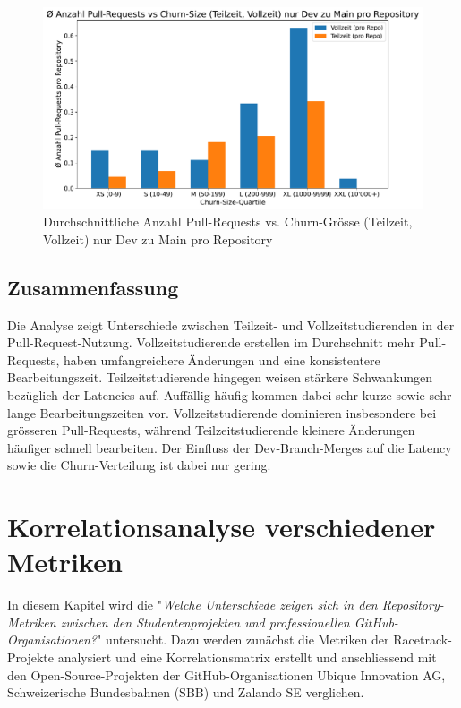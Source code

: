 \begin{figure}[htbp]
    \includegraphics[width=\textwidth]{Figures/avg-anz-prs-vs-churn-size-tz-vz-pro-repo-nur-dev.pdf}
    \caption{Durchschnittliche Anzahl Pull-Requests vs. Churn-Grösse (Teilzeit, Vollzeit) nur Dev zu Main pro Repository}
    \label{fig:anz-prs-vs-churn-size-tz-vz-nur-dev}
\end{figure}

\subsection{Zusammenfassung}

Die Analyse zeigt Unterschiede zwischen Teilzeit- und Vollzeitstudierenden in der Pull-Request-Nutzung. Vollzeitstudierende erstellen im Durchschnitt mehr Pull-Requests, haben umfangreichere Änderungen und eine konsistentere Bearbeitungszeit. Teilzeitstudierende hingegen weisen stärkere Schwankungen bezüglich der Latencies auf. Auffällig häufig kommen dabei sehr kurze sowie sehr lange Bearbeitungszeiten vor. Vollzeitstudierende dominieren insbesondere bei grösseren Pull-Requests, während Teilzeitstudierende kleinere Änderungen häufiger schnell bearbeiten. Der Einfluss der Dev-Branch-Merges auf die Latency sowie die Churn-Verteilung ist dabei nur gering. 

\section{Korrelationsanalyse verschiedener Metriken}
\label{sec:Korrelationsanalyse}
In diesem Kapitel wird die  "\textit{Welche Unterschiede zeigen sich in den Repository-Metriken
zwischen den Studentenprojekten und professionellen GitHub-Organisationen?}" untersucht. Dazu werden zunächst die Metriken der Racetrack-Projekte analysiert und eine Korrelationsmatrix erstellt und anschliessend mit den Open-Source-Projekten der GitHub-Organisationen Ubique Innovation AG, Schweizerische Bundesbahnen (SBB) und Zalando SE verglichen.
